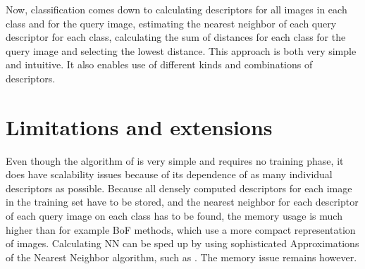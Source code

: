 Now, classification comes down to calculating descriptors for all images in each class and for the query image, estimating the nearest neighbor of each query descriptor for each class, calculating the sum of distances for each class for the query image and selecting the lowest distance. This approach is both very simple and intuitive. It also enables use of different kinds and combinations of descriptors.



\section{Limitations and extensions} %
\label{sub:limitations_and_extensions}

Even though the algorithm of \cite{boiman2008defense} is very simple and requires no training phase, it does have scalability issues because of its dependence of as many individual descriptors as possible. Because all densely computed descriptors for each image in the training set have to be stored, and the nearest neighbor for each descriptor of each query image on each class has to be found, the memory usage is much higher than for example BoF methods, which use a more compact representation of images. Calculating NN can be sped up by using sophisticated Approximations of the Nearest Neighbor algorithm, such as . The memory issue remains however.

